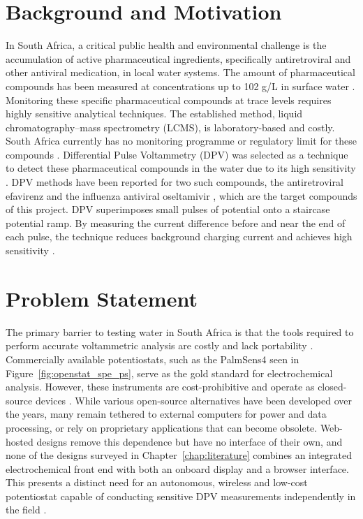 \label{chap:introduction}

\section{Background and Motivation}
\label{sec:bg_and_info}

In South Africa, a critical public health and environmental challenge is the accumulation of active pharmaceutical ingredients, specifically antiretroviral and other antiviral medication, in local water systems. The amount of pharmaceutical compounds has been measured at concentrations up to 102 \textmu g/L in surface water \cite{schoeman2017efavirenz,Wood2015}. Monitoring these specific pharmaceutical compounds at trace levels requires highly sensitive analytical techniques. The established method, liquid chromatography–mass spectrometry (LCMS), is laboratory-based and costly. South Africa currently has no monitoring programme or regulatory limit for these compounds \cite{schoeman2017efavirenz}. Differential Pulse Voltammetry (DPV) was selected as a technique to detect these pharmaceutical compounds in the water due to its high sensitivity \cite{Uslu2011}. DPV methods have been reported for two such compounds, the antiretroviral efavirenz and the influenza antiviral oseltamivir \cite{dogantopal2009efavirenz,pop2012oseltamivir}, which are the target compounds of this project.
DPV superimposes small pulses of potential onto a staircase potential ramp. By measuring the current difference before and near the end of each pulse, the technique reduces background charging current and achieves high sensitivity \cite{IUPAC_DPV}.

\section{Problem Statement}
\label{sec:prob_statement}
The primary barrier to testing water in South Africa is that the tools required to perform accurate voltammetric analysis are costly and lack portability \cite{ainla2018,rowe2011}. Commercially available potentiostats, such as the PalmSens4 seen in Figure~\ref{fig:openstat_spe_ps}, serve as the gold standard for electrochemical analysis. However, these instruments are cost-prohibitive and operate as closed-source devices \cite{dryden2015}. While various open-source alternatives have been developed over the years, many remain tethered to external computers \cite{ainla2018} for power and data processing, or rely on proprietary applications that can become obsolete. Web-hosted designs remove this dependence but have no interface of their own, and none of the designs surveyed in Chapter~\ref{chap:literature} combines an integrated electrochemical front end with both an onboard display and a browser interface. This presents a distinct need for an autonomous, wireless and low-cost potentiostat capable of conducting sensitive DPV measurements independently in the field \cite{Hanrahan2004}.

